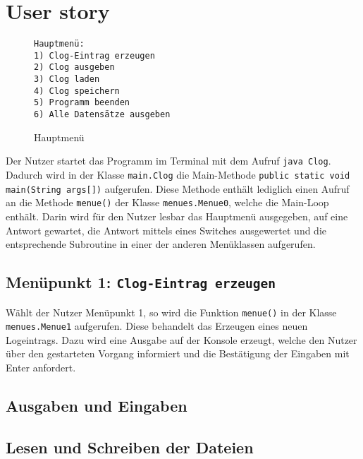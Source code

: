 \documentclass[oneside,12pt]{scrartcl}
\newcommand{\code}[1]{\textcolor{Firebrick4}{\bcode{#1}}}
\newcommand{\bcode}[1]{\texttt{#1}}
\begin{document}
\section{User story}
\begin{wrapfigure}{r}{0.4\textwidth}
\vspace{-10pt}
\begin{verbatim}
Hauptmenü:
1) Clog-Eintrag erzeugen
2) Clog ausgeben
3) Clog laden
4) Clog speichern
5) Programm beenden
6) Alle Datensätze ausgeben
\end{verbatim}
\vspace{-10pt}
\caption{Hauptmenü}
\end{wrapfigure}
Der Nutzer startet das Programm im Terminal mit dem Aufruf \code{java Clog}. Dadurch wird in der Klasse \code{main.Clog} die Main-Methode \code{public static void main(String args[])} aufgerufen. Diese Methode enthält lediglich einen Aufruf an die Methode \code{menue()} der Klasse \code{menues.Menue0}, welche die Main-Loop enthält. Darin wird für den Nutzer lesbar das Hauptmenü ausgegeben, auf eine Antwort gewartet, die Antwort mittels eines Switches ausgewertet und die entsprechende Subroutine in einer der anderen Menüklassen aufgerufen. 

\subsection{Menüpunkt 1: \code{Clog-Eintrag erzeugen}}
Wählt der Nutzer Menüpunkt 1, so wird die Funktion \code{menue()} in der Klasse \code{menues.Menue1} aufgerufen. Diese behandelt das Erzeugen eines neuen Logeintrags. Dazu wird eine Ausgabe auf der Konsole erzeugt, welche den Nutzer über den gestarteten Vorgang informiert und die Bestätigung der Eingaben mit Enter anfordert. 

\subsection{Ausgaben und Eingaben}

\subsection{Lesen und Schreiben der Dateien}
\end{document}
